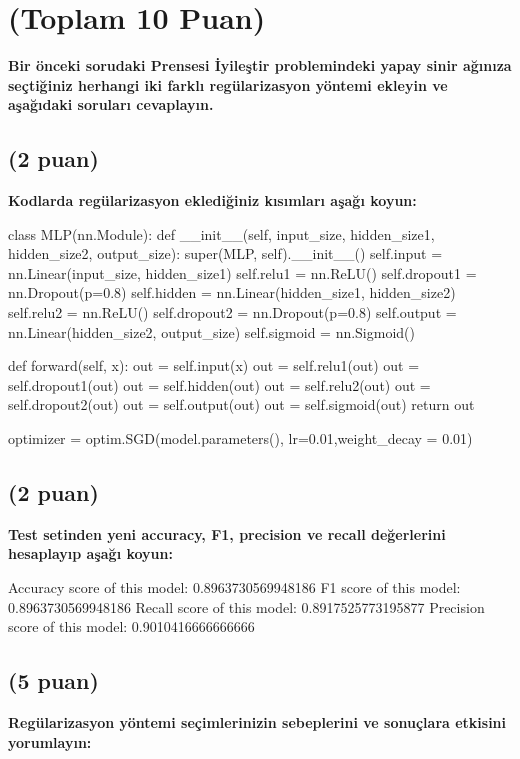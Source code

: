 \documentclass[11pt]{article}
\begin{document}
\section{(Toplam 10 Puan)} \textbf{Bir önceki sorudaki Prensesi İyileştir problemindeki yapay sinir ağınıza seçtiğiniz herhangi iki farklı regülarizasyon yöntemi ekleyin ve aşağıdaki soruları cevaplayın.} 

\subsection{(2 puan)} \textbf{Kodlarda regülarizasyon eklediğiniz kısımları aşağı koyun:} 

\begin{python}
class MLP(nn.Module):
    def __init__(self, input_size, hidden_size1, hidden_size2, output_size):
        super(MLP, self).__init__()
        self.input = nn.Linear(input_size, hidden_size1)
        self.relu1 = nn.ReLU()
        self.dropout1 = nn.Dropout(p=0.8)
        self.hidden = nn.Linear(hidden_size1, hidden_size2)
        self.relu2 = nn.ReLU()
        self.dropout2 = nn.Dropout(p=0.8)
        self.output = nn.Linear(hidden_size2, output_size)
        self.sigmoid = nn.Sigmoid()

    def forward(self, x):
        out = self.input(x)
        out = self.relu1(out)
        out = self.dropout1(out)
        out = self.hidden(out)
        out = self.relu2(out)
        out = self.dropout2(out)
        out = self.output(out)
        out = self.sigmoid(out)
        return out

optimizer = optim.SGD(model.parameters(), lr=0.01,weight_decay = 0.01) 
\end{python}

\subsection{(2 puan)} \textbf{Test setinden yeni accuracy, F1, precision ve recall değerlerini hesaplayıp aşağı koyun:}

Accuracy score of this model: 0.8963730569948186
F1 score of this model: 0.8963730569948186
Recall score of this model: 0.8917525773195877
Precision score of this model: 0.9010416666666666

\subsection{(5 puan)} \textbf{Regülarizasyon yöntemi seçimlerinizin sebeplerini ve sonuçlara etkisini yorumlayın:}
\end{document}
